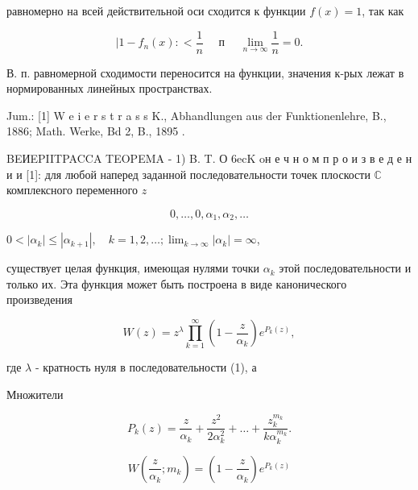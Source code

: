 \documentclass[10pt]{article}
\begin{document}
равномерно на всей действительной оси сходится к функции $f(x)=1$, так как



\[

\mid 1-f_{n}(x):<\frac{1}{n} \quad \text { п } \quad \lim _{n \rightarrow \infty} \frac{1}{n}=0 .

\]



В. п. равномерной сходимости переносится на функции, значения к-рых лежат в нормированных линейных пространствах.



Jum.: [1] W e i e r s t r a s s K., Abhandlungen aus der Funktionenlehre, B., 1886; Math. Werke, Bd 2, B., 1895 .



BEИEPIITPACCA TEOPEMA - 1) B. T. О $6 \mathrm{e} \mathrm{c} \mathrm{K}$ oн е ч н о м п р о и з в е д е н и и [1]: для любой наперед заданной последовательности точек плоскости $\mathbb{C}$ комплексного переменного $z$



\[

0, \ldots, 0, \alpha_{1}, \alpha_{2}, \ldots

\]



$0<\left|\alpha_{k}\right| \leqslant\left|\alpha_{k+1}\right|, \quad k=1,2, \ldots ; \lim _{k \rightarrow \infty}\left|\alpha_{k}\right|=\infty$,



существует целая функция, имеющая нулями точки $\alpha_{k}$ этой последовательности и только их. Эта функция может быть построена в виде канонического произведения



\[

W(z)=z^{\lambda} \prod_{k=1}^{\infty}\left(1-\frac{z}{\alpha_{k}}\right) e^{P_{k}(z)},

\]



где $\lambda$ - кратность нуля в последовательности (1), а



Множители



\[

P_{k}(z)=\frac{z}{\alpha_{k}}+\frac{z^{2}}{2 \alpha_{k}^{2}}+\ldots+\frac{z_{k}^{m_{k}}}{k \alpha_{k}^{m_{k}}} .

\]



\[

W\left(\frac{z}{\alpha_{k}} ; m_{k}\right)=\left(1-\frac{z}{\alpha_{k}}\right) e^{P_{k}(z)}

\]
\end{document}
